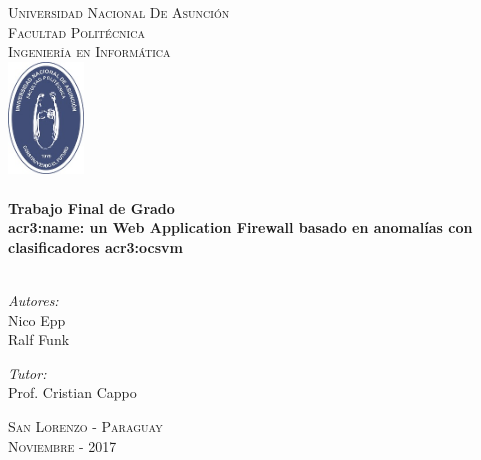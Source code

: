 \documentclass[oneside,12pt]{thesis}
\begin{document}
    \begin{titlepage}
        \begin{center}
            \textsc{\LARGE Universidad Nacional De Asunción}        \\[1cm]
            \textsc{\LARGE Facultad Politécnica}                    \\[1cm]
            \textsc{\LARGE Ingeniería en Informática}               \\[1.5cm]
            \includegraphics[width=20mm]{images/Escudo_FPUNA.jpg}   \\[1cm]

            \HRule                                                  \\[0.5cm]
            {\bfseries \large
                Trabajo Final de Grado
            }                                                       \\[0.5cm]
            {\bfseries \large
                \gls{acr3:name}:
                un Web Application Firewall basado en anomalías
                con clasificadores \gls{acr3:ocsvm}
            }                                                       \\[0.5cm]
            \HRule                                                  \\[1.5cm]

            \begin{minipage}[t]{0.4\textwidth}
                \begin{flushleft}
                    \large
                    \emph{Autores:}                                 \\[0.2cm]
                    Nico Epp                                        \\[0.2cm]
                    Ralf Funk
                \end{flushleft}
            \end{minipage}
            \begin{minipage}[t]{0.4\textwidth}
                \begin{flushright}
                    \large
                    \emph{Tutor:}                                   \\[0.2cm]
                    Prof. Cristian Cappo
                \end{flushright}
            \end{minipage}

            \vfill

            \textsc{\large San Lorenzo - Paraguay} \\
            \textsc{\large Noviembre - 2017}
        \end{center}
    \end{titlepage}
\end{document}
